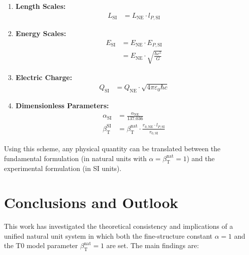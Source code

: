 \documentclass[12pt,a4paper]{article}
\newcommand{\betaT}{\beta_{\text{T}}}
\begin{document}
	\begin{tcolorbox}[colback=blue!5!white,colframe=blue!75!black,title=Conversion Scheme for Natural and SI Units]
		\begin{enumerate}
			\item \textbf{Length Scales:}
			\begin{align}
				L_{\text{SI}} &= L_{\text{NE}} \cdot l_{P,\text{SI}}
			\end{align}
			\item \textbf{Energy Scales:}
			\begin{align}
				E_{\text{SI}} &= E_{\text{NE}} \cdot E_{P,\text{SI}} \\
				&= E_{\text{NE}} \cdot \sqrt{\frac{\hbar c^5}{G}}
			\end{align}
			\item \textbf{Electric Charge:}
			\begin{align}
				Q_{\text{SI}} &= Q_{\text{NE}} \cdot \sqrt{4\pi\varepsilon_0 \hbar c}
			\end{align}
			\item \textbf{Dimensionless Parameters:}
			\begin{align}
				\alpha_{\text{SI}} &= \frac{\alpha_{\text{NE}}}{137.036} \\
				\betaT^{\text{SI}} &= \betaT^{\text{nat}} \cdot \frac{r_{0,\text{NE}} \cdot l_{P,\text{SI}}}{r_{0,\text{SI}}}
			\end{align}
		\end{enumerate}
	\end{tcolorbox}
	
	Using this scheme, any physical quantity can be translated between the fundamental formulation (in natural units with \(\alpha = \betaT^{\text{nat}} = 1\)) and the experimental formulation (in SI units).
	
	\section{Conclusions and Outlook}
	
	This work has investigated the theoretical consistency and implications of a unified natural unit system in which both the fine-structure constant \(\alpha = 1\) and the T0 model parameter \(\betaT^{\text{nat}} = 1\) are set. The main findings are:
	
\end{document}
